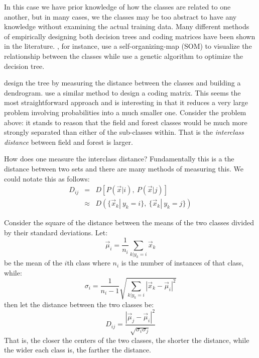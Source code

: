\documentclass{article}
\begin{document}
In this case we have prior knowledge of how the classes are related to one another,
but in many cases, we the classes may be too abstract to have any knowledge without examining the actual training data.
Many different methods of empirically designing both decision trees and coding matrices have been shown in the literature.
\citet{Cheong_etal2004}, for instance, use a self-organizing-map (SOM)
\cite{Kohonen2000} to visualize the relationship between the classes while
\citet{Lee_Oh2003} use a genetic algorithm to optimize the decision tree.

\citet{Benabdeslem_Bennani2006} design the tree by measuring the distance between
the classes and building a dendrogram.
\citet{Zhou_etal2008} use a similar method to design a coding matrix.
This seems the most straightforward approach and is interesting in that it reduces a very large problem involving probabilities into a much smaller one.
Consider the problem above: it stands to reason that the field and forest classes would be much more strongly separated than either of the sub-classes within.
That is the {\it interclass distance} between field and forest is larger.

How does one measure the interclass distance? Fundamentally this is a the distance between two sets and there are many methods of measuring this.
We could notate this as follows:
\begin{eqnarray}
	D_{ij} & = & D\left [P(\vec x|i),~P(\vec x|j)\right ] \\
	       & \approx & D\left (\lbrace \vec x_k|~y_k=i \rbrace,~\lbrace \vec x_k|~y_k=j\rbrace \right )
\end{eqnarray}

Consider the square of the distance between the means of the two classes divided by their standard deviations. Let:
\begin{equation}
	\vec \mu_i = \frac{1}{n_i} \sum_{k|y_k=i} \vec x_k
\end{equation}
be the mean of the $i$th class where $n_i$ is the number of instances of that class, while:
\begin{equation}
	\sigma_i = \frac{1}{n_i-1}\sqrt{\sum_{k|y_k=i}|\vec x_k - \vec \mu_i|^2}
\end{equation}
then let the distance between the two classes be:
\begin{equation}
	D_{ij}=\frac{|\vec \mu_j - \vec \mu_i |^2}{\sqrt{\sigma_i \sigma_j}}
\end{equation}
That is, the closer the centers of the two classes, the shorter the distance, while the wider each class is, the farther the distance.
	
\end{document}
